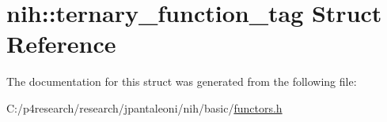 \hypertarget{structnih_1_1ternary__function__tag}{
\section{nih\-:\-:ternary\-\_\-function\-\_\-tag \-Struct \-Reference}
\label{structnih_1_1ternary__function__tag}
}


\-The documentation for this struct was generated from the following file\-:\begin{DoxyCompactItemize}
\item 
\-C\-:/p4research/research/jpantaleoni/nih/basic/\hyperlink{functors_8h}{functors.\-h}\end{DoxyCompactItemize}
